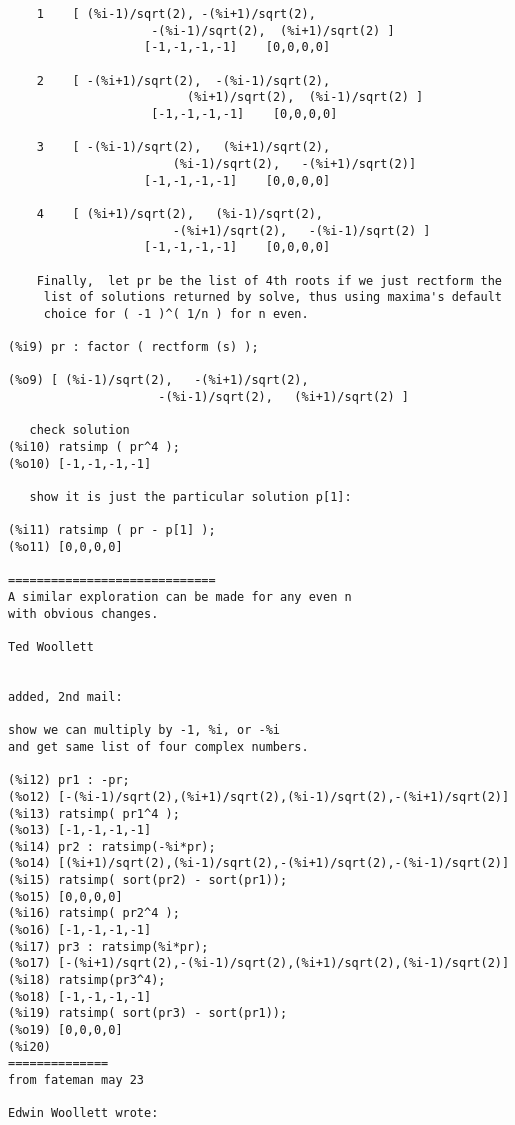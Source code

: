 \documentclass[12pt]{article}
\begin{document}
\begin{verbatim}
    1    [ (%i-1)/sqrt(2), -(%i+1)/sqrt(2),  
                    -(%i-1)/sqrt(2),  (%i+1)/sqrt(2) ] 
                   [-1,-1,-1,-1]    [0,0,0,0] 

    2    [ -(%i+1)/sqrt(2),  -(%i-1)/sqrt(2),  
                         (%i+1)/sqrt(2),  (%i-1)/sqrt(2) ] 
                    [-1,-1,-1,-1]    [0,0,0,0] 

    3    [ -(%i-1)/sqrt(2),   (%i+1)/sqrt(2), 
                       (%i-1)/sqrt(2),   -(%i+1)/sqrt(2)] 
                   [-1,-1,-1,-1]    [0,0,0,0] 

    4    [ (%i+1)/sqrt(2),   (%i-1)/sqrt(2),  
                       -(%i+1)/sqrt(2),   -(%i-1)/sqrt(2) ] 
                   [-1,-1,-1,-1]    [0,0,0,0] 
         
    Finally,  let pr be the list of 4th roots if we just rectform the
     list of solutions returned by solve, thus using maxima's default
     choice for ( -1 )^( 1/n ) for n even.
  
(%i9) pr : factor ( rectform (s) );

(%o9) [ (%i-1)/sqrt(2),   -(%i+1)/sqrt(2),  
                     -(%i-1)/sqrt(2),   (%i+1)/sqrt(2) ]

   check solution
(%i10) ratsimp ( pr^4 );
(%o10) [-1,-1,-1,-1]

   show it is just the particular solution p[1]:

(%i11) ratsimp ( pr - p[1] );
(%o11) [0,0,0,0]

=============================
A similar exploration can be made for any even n
with obvious changes.

Ted Woollett


added, 2nd mail:

show we can multiply by -1, %i, or -%i
and get same list of four complex numbers.

(%i12) pr1 : -pr;
(%o12) [-(%i-1)/sqrt(2),(%i+1)/sqrt(2),(%i-1)/sqrt(2),-(%i+1)/sqrt(2)]
(%i13) ratsimp( pr1^4 );
(%o13) [-1,-1,-1,-1]
(%i14) pr2 : ratsimp(-%i*pr);
(%o14) [(%i+1)/sqrt(2),(%i-1)/sqrt(2),-(%i+1)/sqrt(2),-(%i-1)/sqrt(2)]
(%i15) ratsimp( sort(pr2) - sort(pr1));
(%o15) [0,0,0,0]
(%i16) ratsimp( pr2^4 );
(%o16) [-1,-1,-1,-1]
(%i17) pr3 : ratsimp(%i*pr);
(%o17) [-(%i+1)/sqrt(2),-(%i-1)/sqrt(2),(%i+1)/sqrt(2),(%i-1)/sqrt(2)]
(%i18) ratsimp(pr3^4);
(%o18) [-1,-1,-1,-1]
(%i19) ratsimp( sort(pr3) - sort(pr1));
(%o19) [0,0,0,0]
(%i20) 
==============
from fateman may 23

Edwin Woollett wrote:


\end{verbatim}
\end{document}
